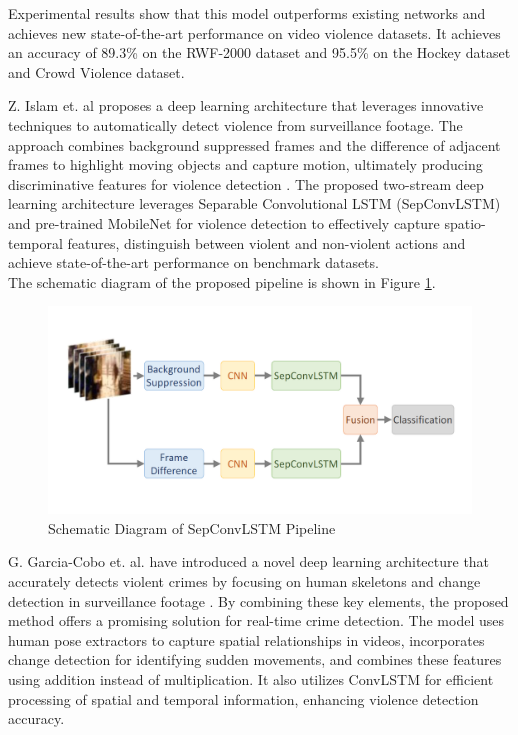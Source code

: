 \noindent Experimental results show that this model outperforms existing networks and achieves new state-of-the-art performance on video violence datasets. It achieves an accuracy of 89.3\% on the RWF-2000 dataset and 95.5\% on the Hockey dataset and Crowd Violence dataset.

\noindent Z. Islam et. al proposes a deep learning architecture that leverages innovative techniques to automatically detect violence from surveillance footage. The approach combines background suppressed frames and the difference of adjacent frames to highlight moving objects and capture motion, ultimately producing discriminative features for violence detection \cite{SepConvLSTM}. The proposed two-stream deep learning architecture leverages Separable Convolutional LSTM (SepConvLSTM) and pre-trained MobileNet for violence detection to effectively capture spatio-temporal features, distinguish between violent and non-violent actions and achieve state-of-the-art performance on benchmark datasets. \\ The schematic diagram of the proposed pipeline is shown in Figure \ref{fig:sepconvlstm}.
\begin{figure}[htbp!]
    \centering
    \includegraphics[width=1\linewidth]{Images/sepconv.png}
    \caption{Schematic Diagram of SepConvLSTM Pipeline}
    \label{fig:sepconvlstm}
\end{figure}

\noindent G. Garcia-Cobo et. al. have introduced a novel deep learning architecture that accurately detects violent crimes by focusing on human skeletons and change detection in surveillance footage \cite{HumanSkeleton_ConvLSTM}. By combining these key elements, the proposed method offers a promising solution for real-time crime detection. The model uses human pose extractors to capture spatial relationships in videos, incorporates change detection for identifying sudden movements, and combines these features using addition instead of multiplication. It also utilizes ConvLSTM for efficient processing of spatial and temporal information, enhancing violence detection accuracy.

